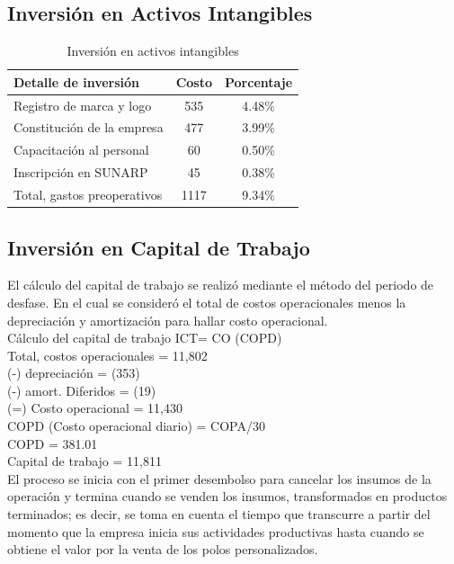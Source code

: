\documentclass[a4paper,openright,12pt]{book}
\begin{document}
\subsection{Inversión en Activos Intangibles}

\begin{table}[H]
\begin{tabular}{lcc}
\hline
\textbf{Detalle de inversión}    & \textbf{Costo}    &  \textbf{Porcentaje}    \\
\hline %
Registro de marca y logo         &     535           &      4.48\%             \\
Constitución de la empresa       &     477           &      3.99\%             \\
Capacitación al personal         &     60            &      0.50\%             \\
Inscripción en SUNARP            &     45            &      0.38\%             \\
Total, gastos preoperativos      &     1117          &      9.34\%             \\
\hline
\end{tabular}
\caption{Inversión en activos intangibles}
\label{Tabla5}
\end{table}


\subsection{Inversión en Capital de Trabajo}
El cálculo del capital de trabajo se realizó mediante el método del periodo de desfase. En el cual se consideró el total de costos operacionales menos la depreciación y amortización para hallar costo operacional.\\

Cálculo del capital de trabajo ICT= CO (COPD)\\
Total, costos operacionales =	11,802\\
(-) depreciación =	(353)\\
(-) amort. Diferidos =	(19)\\
(=) Costo operacional =	11,430\\
    COPD (Costo operacional diario) = 	COPA/30\\
COPD =	381.01\\
Capital de trabajo =	11,811\\

El proceso se inicia con el primer desembolso para cancelar los insumos de la operación y termina cuando se venden los insumos, transformados en productos terminados; es decir, se toma en cuenta el tiempo que transcurre a partir del momento que la empresa inicia sus actividades productivas hasta cuando se obtiene el valor por la venta de los polos personalizados.
\end{document}
